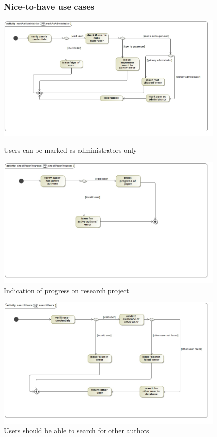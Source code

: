 \documentclass[a4paper,12pt]{report}
\begin{document}
\begin{figure}[ht]
\subsubsection{Nice-to-have use cases}
\includegraphics[scale=0.5]{act__markAsAdministrator__markAsAdministrator.jpg} 
\caption{Users can be marked as administrators only}


\includegraphics[scale=0.5]{act__checkPaperProgress__checkPaperProgress.jpg} 
\caption{Indication of progress on research project}

\end{figure}
\newpage
\begin{figure}[ht]

\includegraphics[scale=0.5]{act__searchUsers__searchUsers.jpg} 
\caption{Users should be able to search for other authors}


\end{figure}
\end{document}
